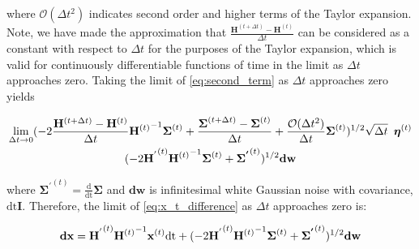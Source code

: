 \documentclass[12pt,]{article}
\begin{document}
\noindent where $\mathcal{O}(\Delta t^2)$ indicates second order and higher terms of the Taylor expansion. Note, we have made the approximation that $\frac{\mathbf{H}^{(t+\Delta t)} -  {\mathbf{H}^{(t)}}}{\Delta t}$ can be considered as a constant with respect to $\Delta t$ for the purposes of the Taylor expansion, which is valid for continuously differentiable functions of time in the limit as $\Delta t$ approaches zero. Taking the limit of \eqref{eq:second_term} as $\Delta t$ approaches zero yields

\begin{gather}
    \lim_{\Delta t \rightarrow 0} (-  2 \frac{{\mathbf{H}^{(t+\Delta t)}} -  {\mathbf{H}^{(t)}}}{\Delta t} {\mathbf{H}^{(t)}}^{\hspace{0mm}-1}  \boldsymbol{\Sigma}^{(t)} + \frac{\boldsymbol{\Sigma}^{(t + \Delta t)} - \boldsymbol{\Sigma}^{(t)}}{\Delta t} + \frac{\mathcal{O}(\Delta t^2)}{\Delta t} \boldsymbol{\Sigma}^{(t)})^{1/2} \sqrt{\Delta t} \enspace \boldsymbol{\eta}^{(t)} \\
    (-  2 {\mathbf{H^{'}}^{(t)}} {\mathbf{H}^{(t)}}^{\hspace{0mm}-1}  \boldsymbol{\Sigma}^{(t)} + \boldsymbol{\Sigma^{'}}^{(t)}  )^{1/2} \mathbf{dw}
\end{gather}

\noindent where $\boldsymbol{\Sigma^{'}}^{(t)} = \frac{\text{d}}{\text{dt}} \boldsymbol{\Sigma}$ and $\mathbf{dw}$ is infinitesimal white Gaussian noise with covariance, $\text{dt} \mathbf{I}$. Therefore, the limit of \eqref{eq:x_t_difference} as $\Delta t$ approaches zero is:

\begin{equation}
    \mathbf{dx} = \mathbf{H^{'}}^{(t)}{\mathbf{H}^{(t)}}^{\hspace{0mm}-1} \mathbf{x}^{(t)} \text{dt} + (-  2 {\mathbf{H^{'}}^{(t)}} {\mathbf{H}^{(t)}}^{\hspace{0mm}-1}  \boldsymbol{\Sigma}^{(t)} + \boldsymbol{\Sigma^{'}}^{(t)}  )^{1/2} \mathbf{dw}
\end{equation}







\end{document}
